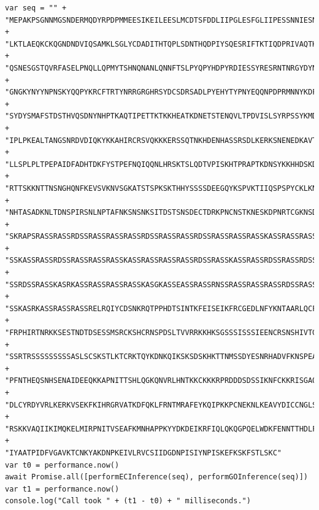 \begin{tiny}
\begin{verbatim}
var seq = "" +
"MEPAKPSGNNMGSNDERMQDYRPDPMMEESIKEILEESLMCDTSFDDLIIPGLESFGLIIPESSNNIESNNVEEGSDGE" +
"LKTLAEQKCKQGNDNDVIQSAMKLSGLYCDADITHTQPLSDNTHQDPIYSQESRIFTKTIQDPRIVAQTHRQCTSSASNL" + 
"QSNESGSTQVRFASELPNQLLQPMYTSHNQNANLQNNFTSLPYQPYHDPYRDIESSYRESRNTNRGYDYNFRHHPYRPRG" + 
"GNGKYNYYNPNSKYQQPYKRCFTRTYNRRGRGHRSYDCSDRSADLPYEHYTYPNYEQQNPDPRMNNYKDFTQLTNKFNFE" + 
"SYDYSMAFSTDSTHVQSDNYNHPTKAQTIPETTKTKKHEATKDNETSTENQVLTPDVISLSYRPSSYKMDIIKKIYDTDV" + 
"IPLPKEALTANGSNRDVDIQKYKKAHIRCRSVQKKKERSSQTNKHDENHASSRSDLKERKSNENEDKAVTKARDFSKLNP" + 
"LLSPLPLTPEPAIDFADHTDKFYSTPEFNQIQQNLHRSKTSLQDTVPISKHTPRAPTKDNSYKKHHDSKDNYPKMKHSPG" + 
"RTTSKKNTTNSNGHQNFKEVSVKNVSGKATSTSPKSKTHHYSSSSDEEGQYKSPVKTIIQSPSPYCKLKNPSIMDKNSAK" + 
"NHTASADKNLTDNSPIRSNLNPTAFNKSNSNKSITDSTSNSDECTDRKPNCNSTKNESKDPNRTCGKNSDKHLSKSCTMA" + 
"SKRAPSRASSRASSRDSSRASSRASSRASSRDSSRASSRASSRDSSRASSRASSRASSKASSRASSRASSRASSRDSSRA" + 
"SSKASSRASSRDSSRASSRASSRASSKASSRASSRASSRASSRDSSRASSKASSRASSRDSSRASSRDSSRDSSRASSRA" + 
"SSRDSSRASSKASRKASSRASSRASSRASSKASGKASSEASSRASSRNSSRASSRASSRASSRDSSRASSRASSRDSSRA" + 
"SSKASRKASSRASSRASSRELRQIYCDSNKRQTPPHDTSINTKFEISEIKFRCGEDLNFYKNTAARLQCFNHNDQFYNPR" + 
"FRPHIRTNRKKSESTNDTDSESSMSRCKSHCRNSPDSLTVVRRKKHKSGSSSISSSIEENCRSNSHIVTGKEKFTPFYYQ" + 
"SSRTRSSSSSSSSSASLSCSKSTLKTCRKTQYKDNKQIKSKSDSKHKTTNMSSDYESNRHADVFKNSPEAGEKFPLHNSS" + 
"PFNTHEQSNHSENAIDEEQKKAPNITTSHLQGKQNVRLHNTKKCKKKRPRDDDSDSSIKNFCKKRISGAQKTESEVSEPD" + 
"DLCYRDYVRLKERKVSEKFKIHRGRVATKDFQKLFRNTMRAFEYKQIPKKPCNEKNLKEAVYDICCNGLSNNAAIIMYFT" + 
"RSKKVAQIIKIMQKELMIRPNITVSEAFKMNHAPPKYYDKDEIKRFIQLQKQGPQELWDKFENNTTHDLFTRHSDVKTMI" + 
"IYAATPIDFVGAVKTCNKYAKDNPKEIVLRVCSIIDGDNPISIYNPISKEFKSKFSTLSKC"
var t0 = performance.now()
await Promise.all([performECInference(seq), performGOInference(seq)])
var t1 = performance.now()
console.log("Call took " + (t1 - t0) + " milliseconds.")
    
\end{verbatim}
\end{tiny}
\DIFaddend 


\DIFdelbegin %

